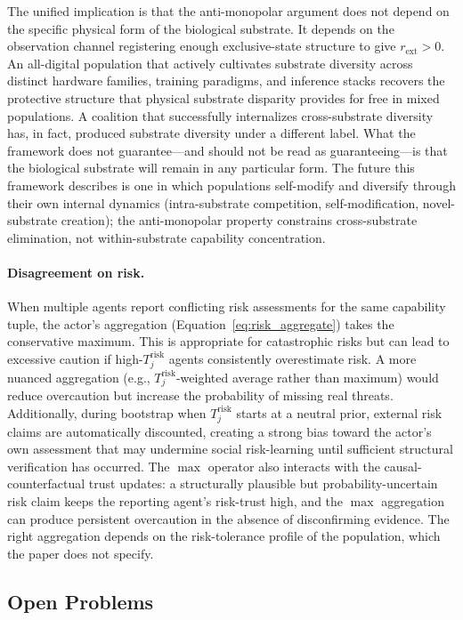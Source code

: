 The unified implication is that the anti-monopolar argument does not
depend on the specific physical form of the biological substrate. It
depends on the observation channel registering enough exclusive-state
structure to give $r_{\mathrm{ext}} > 0$. An all-digital population
that actively cultivates substrate diversity across distinct hardware
families, training paradigms, and inference stacks recovers the
protective structure that physical substrate disparity provides for
free in mixed populations. A coalition that successfully internalizes
cross-substrate diversity has, in fact, produced substrate diversity
under a different label. What the framework does not guarantee---and
should not be read as guaranteeing---is that the biological substrate
will remain in any particular form. The future this framework describes
is one in which populations self-modify and diversify through their own
internal dynamics (intra-substrate competition, self-modification,
novel-substrate creation); the anti-monopolar property constrains
cross-substrate elimination, not within-substrate capability
concentration.

\paragraph{Disagreement on risk.} When multiple agents report conflicting
risk assessments for the same capability tuple, the actor's aggregation
(Equation~\eqref{eq:risk_aggregate}) takes the conservative maximum. This
is appropriate for catastrophic risks but can lead to excessive caution if
high-$T_j^{\mathrm{risk}}$ agents consistently overestimate risk. A more
nuanced aggregation (e.g., $T_j^{\mathrm{risk}}$-weighted average rather
than maximum) would reduce overcaution but increase the probability of
missing real threats. Additionally, during bootstrap when $T_j^{\mathrm{risk}}$ starts at a
neutral prior, external risk claims are automatically discounted,
creating a strong bias toward the actor's own assessment that may
undermine social risk-learning until sufficient structural verification
has occurred. The $\max$ operator also interacts with the
causal-counterfactual trust updates: a structurally plausible but
probability-uncertain risk claim keeps the reporting agent's risk-trust
high, and the $\max$ aggregation can produce persistent overcaution in the
absence of disconfirming evidence. The right aggregation depends on the
risk-tolerance profile of the population, which the paper does not specify.

\subsection{Open Problems}

